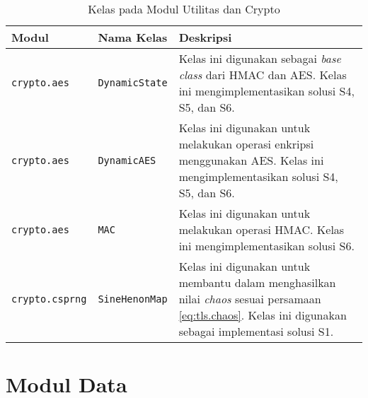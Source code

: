 \begin{table}[!h]
  \centering
  \caption{Kelas pada Modul Utilitas dan Crypto} \label{tab:impl.util.crypto}
  \begin{tabular}{|p{2.75cm}|p{3.5cm}|p{8cm}|}
    \hline
    \textbf{Modul} & \textbf{Nama Kelas} & \textbf{Deskripsi} \\ \hline
    \texttt{crypto.aes} & \texttt{DynamicState} & Kelas ini digunakan sebagai \emph{base class} dari HMAC dan AES. Kelas ini mengimplementasikan solusi S4, S5, dan S6.\\ \hline
    \texttt{crypto.aes} & \texttt{DynamicAES} & Kelas ini digunakan untuk melakukan operasi enkripsi menggunakan AES. Kelas ini mengimplementasikan solusi S4, S5, dan S6.\\ \hline
    \texttt{crypto.aes} & \texttt{MAC} & Kelas ini digunakan untuk melakukan operasi HMAC. Kelas ini mengimplementasikan solusi S6.\\ \hline
    \texttt{crypto.csprng} & \texttt{SineHenonMap} & Kelas ini digunakan untuk membantu dalam menghasilkan nilai \emph{chaos} sesuai persamaan \ref{eq:tls.chaos}. Kelas ini digunakan sebagai implementasi solusi S1.\\ \hline
  \end{tabular}
\end{table}

\section{Modul Data}

